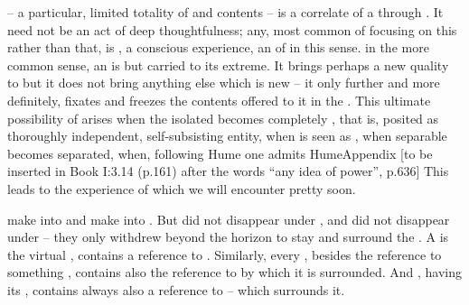  -- a particular, limited totality of  and
 contents -- is a correlate of a  through
. It need not be an act of
deep thoughtfulness; any, most common  of focusing on this rather
than that, is , a conscious experience, an  of
 in this sense.   in the more common sense, an
 is but  carried to its extreme.  It
brings perhaps a new quality to  but it does not bring anything
else which is new -- it only  further and more definitely, fixates
and freezes the contents offered to it in the .  This ultimate possibility of  arises when the
 isolated \thi{\ldots} becomes completely ,
that is, posited as thoroughly independent, self-subsisting entity, when
 is seen as , when separable becomes
separated, when, following Hume one admits \citet{that all our distinct
  perceptions are distinct existences, and that the mind never perceives any
  real connextion among distinct existences.}{Hume}{Appendix [to be inserted in
  Book I:3.14 (p.161) after the words ``any idea of power'', p.636]} This leads
to the experience of  which we will encounter pretty
soon.

\pa {} make  into  and
 make  into . But  did
not disappear under , and  did not disappear under
 -- they only withdrew beyond the horizon to stay and surround
the . A  is the virtual ,
contains a reference to .  Similarly, every ,
besides the reference to something , contains also the reference
to  by which it is surrounded. And , having 
 its , contains always also a
reference to  -- which surrounds it.


